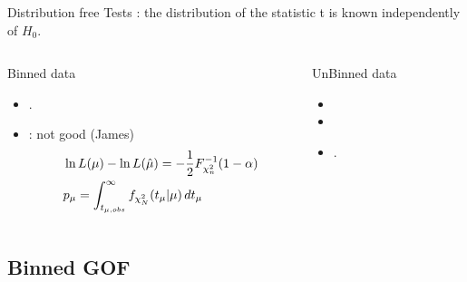 \documentclass[asd-beamer.tex]{subfiles}
\begin{document}
\begin{frame}{Distribution free Tests}
: the distribution of the statistic t is known independently of $H_0$.
\begin{columns}[T]
\begin{column}{0.5\textwidth}
\begin{block}{Binned data}
\begin{itemize}
\item {}.
\item {}: not good (James)
\begin{align*}
&\ln{L(\mu)}-\ln{L(\hat{\mu})}=-\frac{1}{2}{F}^{-1}_{\chi_n^2}(1-\alpha)\\
&p_{\mu}=\int_{t_{\mu,obs}}^{\infty}f_{\chi^2_N}(t_{\mu}|\mu)\,dt_{\mu}
\end{align*}
\end{itemize}
\end{block}
\end{column}
\begin{column}{0.5\textwidth}
\begin{block}{UnBinned data}
\begin{itemize}
\item {}
\item {}
\item {}.
\end{itemize}
\end{block}
\end{column}
\end{columns}
\end{frame}

\subsection{Binned GOF}\label{binnedgof}
\end{document}
